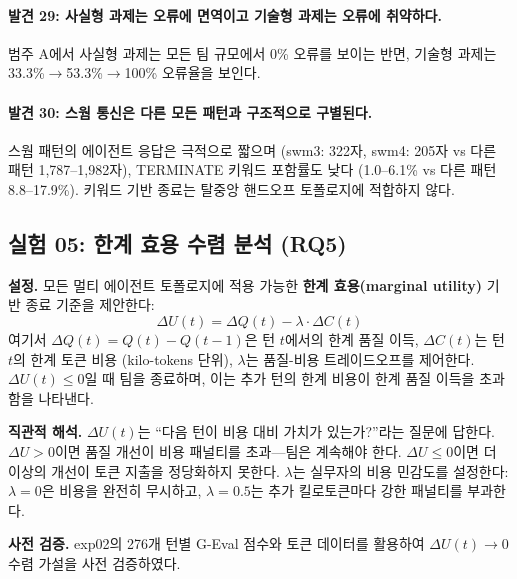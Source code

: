 \documentclass[a4paper,11pt]{article}
\begin{document}
\paragraph{발견 29: 사실형 과제는 오류에 면역이고 기술형 과제는 오류에 취약하다.}
범주 A에서 사실형 과제는 모든 팀 규모에서 0\% 오류를 보이는 반면, 기술형 과제는 33.3\%$\to$53.3\%$\to$100\% 오류율을 보인다.

\paragraph{발견 30: 스웜 통신은 다른 모든 패턴과 구조적으로 구별된다.}
스웜 패턴의 에이전트 응답은 극적으로 짧으며 (swm3: 322자, swm4: 205자 vs 다른 패턴 1,787--1,982자), TERMINATE 키워드 포함률도 낮다 (1.0--6.1\% vs 다른 패턴 8.8--17.9\%). 키워드 기반 종료는 탈중앙 핸드오프 토폴로지에 적합하지 않다.

\subsection{실험 05: 한계 효용 수렴 분석 (RQ5)}
\label{sec:exp05}

\textbf{설정.} 모든 멀티 에이전트 토폴로지에 적용 가능한 \textbf{한계 효용(marginal utility)} 기반 종료 기준을 제안한다:
\begin{equation}
\Delta U(t) = \Delta Q(t) - \lambda \cdot \Delta C(t)
\end{equation}
여기서 $\Delta Q(t) = Q(t) - Q(t-1)$은 턴 $t$에서의 한계 품질 이득, $\Delta C(t)$는 턴 $t$의 한계 토큰 비용 (kilo-tokens 단위), $\lambda$는 품질-비용 트레이드오프를 제어한다. $\Delta U(t) \leq 0$일 때 팀을 종료하며, 이는 추가 턴의 한계 비용이 한계 품질 이득을 초과함을 나타낸다.

\textbf{직관적 해석.} $\Delta U(t)$는 ``다음 턴이 비용 대비 가치가 있는가?''라는 질문에 답한다. $\Delta U > 0$이면 품질 개선이 비용 패널티를 초과---팀은 계속해야 한다. $\Delta U \leq 0$이면 더 이상의 개선이 토큰 지출을 정당화하지 못한다. $\lambda$는 실무자의 비용 민감도를 설정한다: $\lambda=0$은 비용을 완전히 무시하고, $\lambda=0.5$는 추가 킬로토큰마다 강한 패널티를 부과한다.

\textbf{사전 검증.} exp02의 276개 턴별 G-Eval 점수와 토큰 데이터를 활용하여 $\Delta U(t) \to 0$ 수렴 가설을 사전 검증하였다.
\end{document}
